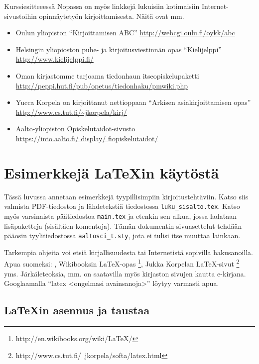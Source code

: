 Kurssiesitteeessä Nopassa on myös linkkejä lukuisiin 
kotimaisiin Internet-sivustoihin opinnäytetyön kirjoittamisesta.
Näitä ovat mm.
%
\begin{itemize}
\item Oulun yliopiston ``Kirjoittamisen ABC''
  \url{http://webcgi.oulu.fi/oykk/abc}
%
\item Helsingin yliopioston puhe- ja kirjoitusviestinnän opas
  ``Kielijelppi'' \url{http://www.kielijelppi.fi/}
%
\item Oman kirjastomme tarjoama tiedonhaun itseopiskelupaketti
  \url{http://peppi.hut.fi/pub/opetus/tiedonhaku/pmwiki.php}
%
\item Yucca Korpela on kirjoittanut nettioppaan ``Arkisen
  asiakirjoittamisen opas'' \url{http://www.cs.tut.fi/~jkorpela/kirj/}
\item Aalto-yliopiston Opiskelutaidot-sivusto \\
  \url{https://into.aalto.fi/ display/ fiopiskelutaidot/}
%
\end{itemize}



\section{Esimerkkejä \LaTeX{}in käytöstä}
\label{sec:esimluku}

Tässä luvussa annetaan esimerkkejä tyypillisimpiin
kirjoitustehtäviin. Katso siis valmista PDF-tiedostoa ja lähdetekstiä
tiedostossa \verb!luku_sisalto.tex!. Katso myös varsinaista
päätiedostoa \verb!main.tex! ja etenkin sen alkua, jossa ladataan
lisäpaketteja (sisältäen komentoja). Tämän dokumentin sivuasettelut
tehdään pääosin tyylitiedostossa \verb!aaltosci_t.sty!, jota ei tulisi
itse muuttaa lainkaan.

Tarkempia ohjeita voi etsiä kirjallisuudesta tai Internetistä
sopivilla hakusanoilla. Apua suomeksi: 
, Wikibooksin LaTeX-opas%
\footnote{http://en.wikibooks.org/wiki/LaTeX/}, Jukka Korpelan
LaTeX-sivut%
\footnote{http://www.cs.tut.fi/~jkorpela/softa/latex.html} yms.
Järkäleteoksia, mm.  on saatavilla myös
kirjaston sivujen kautta e-kirjana. Googlaamalla ``latex <ongelmasi
avainsanoja>'' löytyy varmasti apua.

\subsection{\LaTeX{}in asennus ja taustaa}
\label{sec:esimlatexajo}

